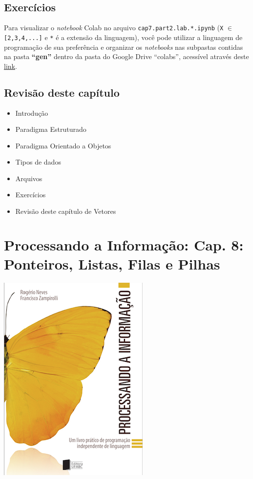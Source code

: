 \documentclass[12pt,a4paper]{article}
\providecommand{\tightlist}{%
      \setlength{\itemsep}{0pt}\setlength{\parskip}{0pt}}
\begin{document}
    \hypertarget{exercuxedcios}{%
\subsection{Exercícios}\label{exercuxedcios}}

    Para visualizar o \emph{notebook} Colab no arquivo
\texttt{cap7.part2.lab.*.ipynb} (\texttt{X} \(\in\)
\texttt{{[}2,3,4,...{]}} e \texttt{*} é a extensão da linguagem), você
pode utilizar a linguagem de programação de sua preferência e organizar
os \emph{notebooks} nas subpastas contidas na pasta \textbf{``gen''}
dentro da pasta do Google Drive ``colabs'', acessível através deste
\href{https://drive.google.com/drive/folders/1YlFwv8XYN7PYYf-HwDMlkxzbmXzJw9cM?usp=sharing}{link}.

    \hypertarget{revisuxe3o-deste-capuxedtulo}{%
\subsection{Revisão deste capítulo}\label{revisuxe3o-deste-capuxedtulo}}

\begin{itemize}
\tightlist
\item
  Introdução
\item
  Paradigma Estruturado
\item
  Paradigma Orientado a Objetos
\item
  Tipos de dados
\item
  Arquivos
\item
  Exercícios
\item
  Revisão deste capítulo de Vetores
\end{itemize}

    \hypertarget{processando-a-informauxe7uxe3o-cap.-8-ponteiros-listas-filas-e-pilhas}{%
\section{Processando a Informação: Cap. 8: Ponteiros, Listas, Filas e
Pilhas}\label{processando-a-informauxe7uxe3o-cap.-8-ponteiros-listas-filas-e-pilhas}}

    \includegraphics{"figs/Capa_Processando_Informacao.jpg"}
\end{document}

